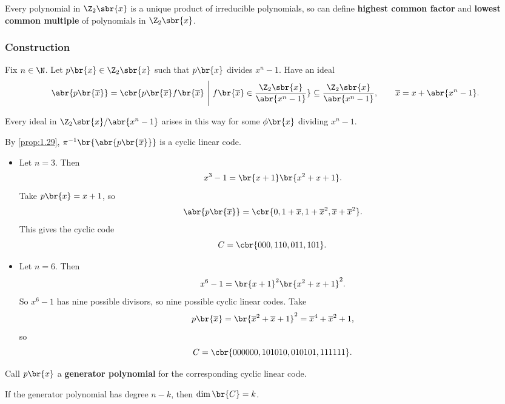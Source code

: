 \begin{fact*}
Every polynomial in $ \Z_2\sbr{x} $ is a unique product of irreducible polynomials, so can define \textbf{highest common factor} and \textbf{lowest common multiple} of polynomials in $ \Z_2\sbr{x} $.
\end{fact*}

\subsubsection{Construction}

Fix $ n \in \N $. Let $ p\br{x} \in \Z_2\sbr{x} $ such that $ p\br{x} $ divides $ x^n - 1 $. Have an ideal
$$ \abr{p\br{\overline{x}}} = \cbr{p\br{\overline{x}}f\br{\overline{x}} \ \Bigg| \ f\br{\overline{x}} \in \dfrac{\Z_2\sbr{x}}{\abr{x^n - 1}}} \subseteq \dfrac{\Z_2\sbr{x}}{\abr{x^n - 1}}, \qquad \overline{x} = x + \abr{x^n - 1}. $$

\begin{fact*}
Every ideal in $ \Z_2\sbr{x} / \abr{x^n - 1} $ arises in this way for some $ \phi\br{x} $ dividing $ x^n - 1 $.
\end{fact*}

By \ref{prop:1.29}, $ \pi^{-1}\br{\abr{p\br{\overline{x}}}} $ is a cyclic linear code.

\begin{example*}
\hfill
\begin{itemize}
\item Let $ n = 3 $. Then
$$ x^3 - 1 = \br{x + 1}\br{x^2 + x + 1}. $$
Take $ p\br{x} = x + 1 $, so
$$ \abr{p\br{\overline{x}}} = \cbr{0, 1 + \overline{x}, 1 + \overline{x}^2, \overline{x} + \overline{x}^2}. $$
This gives the cyclic code
$$ C = \cbr{000, 110, 011, 101}. $$
\item Let $ n = 6 $. Then
$$ x^6 - 1 = \br{x + 1}^2\br{x^2 + x + 1}^2. $$
So $ x^6 - 1 $ has nine possible divisors, so nine possible cyclic linear codes. Take
$$ p\br{\overline{x}} = \br{\overline{x}^2 + \overline{x} + 1}^2 = \overline{x}^4 + \overline{x}^2 + 1, $$
so
$$ C = \cbr{000000, 101010, 010101, 111111}. $$
\end{itemize}
\end{example*}

\begin{definition*}
Call $ p\br{x} $ a \textbf{generator polynomial} for the corresponding cyclic linear code.
\end{definition*}

\begin{proposition}
If the generator polynomial has degree $ n - k $, then $ \dim\br{C} = k $.
\end{proposition}

